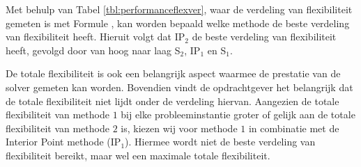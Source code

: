 Met behulp van Tabel \ref{tbl:performanceflexver}, waar de verdeling van flexibiliteit gemeten is met Formule \label{eq:mse}, kan worden bepaald welke methode de beste verdeling van flexibiliteit heeft. Hieruit volgt dat IP$_2$ de beste verdeling van flexibiliteit heeft, gevolgd door van hoog naar laag S$_2$, IP$_1$ en S$_1$. 

De totale flexibiliteit is ook een belangrijk aspect waarmee de prestatie van de solver gemeten kan worden. Bovendien vindt de opdrachtgever het belangrijk dat de totale flexibiliteit niet lijdt onder de verdeling hiervan. Aangezien de totale flexibiliteit van methode $1$ bij elke probleeminstantie groter of gelijk aan de totale flexibiliteit van methode $2$ is, kiezen wij voor methode $1$ in combinatie met de Interior Point methode (IP$_1$). Hiermee wordt niet de beste verdeling van flexibiliteit bereikt, maar wel een maximale totale flexibiliteit.
